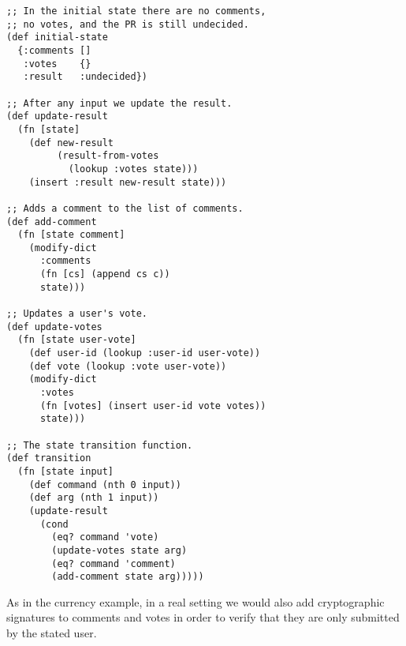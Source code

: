 \begin{lstlisting}
;; In the initial state there are no comments,
;; no votes, and the PR is still undecided.
(def initial-state
  {:comments []
   :votes    {}
   :result   :undecided})

;; After any input we update the result.
(def update-result
  (fn [state]
    (def new-result
         (result-from-votes
           (lookup :votes state)))
    (insert :result new-result state)))

;; Adds a comment to the list of comments.
(def add-comment
  (fn [state comment]
    (modify-dict
      :comments
      (fn [cs] (append cs c))
      state)))

;; Updates a user's vote.
(def update-votes
  (fn [state user-vote]
    (def user-id (lookup :user-id user-vote))
    (def vote (lookup :vote user-vote))
    (modify-dict
      :votes
      (fn [votes] (insert user-id vote votes))
      state)))

;; The state transition function.      
(def transition
  (fn [state input]
    (def command (nth 0 input))
    (def arg (nth 1 input))
    (update-result
      (cond
        (eq? command 'vote)
        (update-votes state arg)
        (eq? command 'comment)
        (add-comment state arg)))))
\end{lstlisting}

As in the currency example, in a real setting we would also add cryptographic
signatures to comments and votes in order to verify that they are only submitted
by the stated user.
